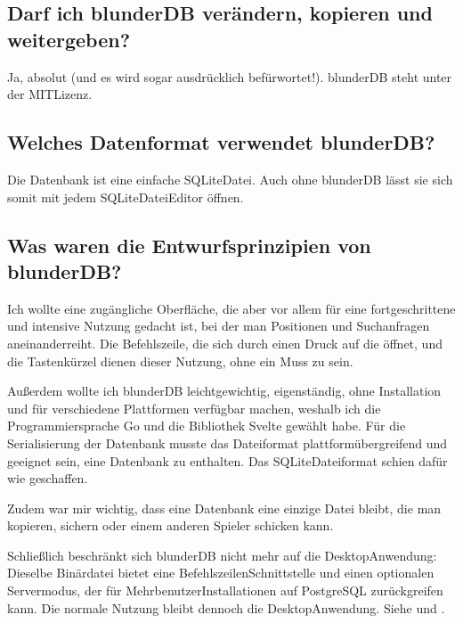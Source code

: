 \documentclass[letterpaper,10pt,german]{sphinxmanual}
\begin{document}
\subsection{Darf ich blunderDB verändern, kopieren und weitergeben?}
\label{\detokenize{faq:puis-je-modifier-copier-partager-blunderdb}}
\sphinxAtStartPar
Ja, absolut (und es wird sogar ausdrücklich befürwortet!). blunderDB steht unter der MIT\sphinxhyphen{}Lizenz.


\subsection{Welches Datenformat verwendet blunderDB?}
\label{\detokenize{faq:quel-format-de-donnees-utilise-blunderdb}}
\sphinxAtStartPar
Die Datenbank ist eine einfache SQLite\sphinxhyphen{}Datei. Auch ohne blunderDB lässt sie sich somit mit jedem SQLite\sphinxhyphen{}Datei\sphinxhyphen{}Editor öffnen.


\subsection{Was waren die Entwurfsprinzipien von blunderDB?}
\label{\detokenize{faq:quelles-ont-ete-les-principes-de-conception-de-blunderdb}}
\sphinxAtStartPar
Ich wollte eine zugängliche Oberfläche, die aber vor allem für eine fortgeschrittene und intensive Nutzung gedacht ist, bei der man Positionen und Suchanfragen aneinanderreiht. Die Befehlszeile, die sich durch einen Druck auf die  öffnet, und die Tastenkürzel dienen dieser Nutzung, ohne ein Muss zu sein.

\sphinxAtStartPar
Außerdem wollte ich blunderDB leichtgewichtig, eigenständig, ohne Installation und für verschiedene Plattformen verfügbar machen, weshalb ich die Programmiersprache Go und die Bibliothek Svelte gewählt habe. Für die Serialisierung der Datenbank musste das Dateiformat plattformübergreifend und geeignet sein, eine Datenbank zu enthalten. Das SQLite\sphinxhyphen{}Dateiformat schien dafür wie geschaffen.

\sphinxAtStartPar
Zudem war mir wichtig, dass eine Datenbank eine einzige Datei bleibt, die man kopieren, sichern oder einem anderen Spieler schicken kann.

\sphinxAtStartPar
Schließlich beschränkt sich blunderDB nicht mehr auf die Desktop\sphinxhyphen{}Anwendung: Dieselbe Binärdatei bietet eine Befehlszeilen\sphinxhyphen{}Schnittstelle und einen optionalen Servermodus, der für Mehrbenutzer\sphinxhyphen{}Installationen auf PostgreSQL zurückgreifen kann. Die normale Nutzung bleibt dennoch die Desktop\sphinxhyphen{}Anwendung. Siehe {\hyperref[\detokenize{cli:cli}]{}} und {\hyperref[\detokenize{mode_headless:headless}]{}}.
\end{document}
